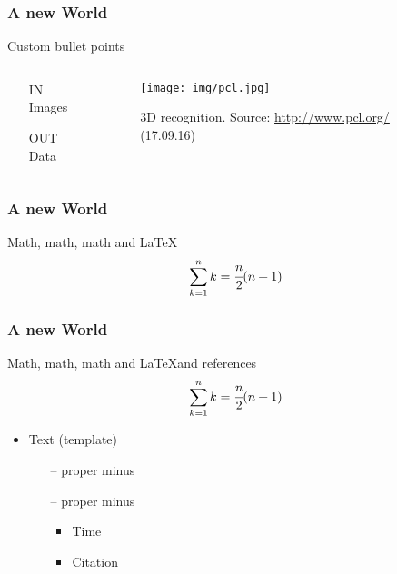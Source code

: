 \documentclass{beamer}
\begin{document}
\begin{frame}
\frametitle{A new World}
Custom bullet points
\begin{columns}
    \begin{column}{0.65\textwidth}
      \begin{itemize}
        \item [IN] Images
        \item [OUT] Data
      \end{itemize}
    \end{column}

    \begin{column}{0.35\textwidth}
      \begin{figure}[ht]
        \centering
        \texttt{[image: img/pcl.jpg]}
        \caption{3D recognition. \tiny{Source: \url{http://www.pcl.org/} (17.09.16)} }
      \end{figure}
    \end{column}
  \end{columns}
\end{frame}

\begin{frame}
    \frametitle{A new World}
    Math, math, math and \LaTeX
    \begin{equation}
      \sum_{k=1}^{n}{k} = \cfrac{n}{2}(n+1)
    \end{equation}
\end{frame}

\begin{frame}
    \frametitle{A new World}
    Math, math, math and \LaTeX and references
    \begin{equation}
      \sum_{k=1}^{n}{k} = \cfrac{n}{2}(n+1)
    \end{equation}

    \begin{itemize}
      \item Text (template)
      \begin{itemize}
        \item [\color{red}--] proper minus
        \item [\color{red}--] proper minus
        \begin{itemize}
          \item Time
          \item Citation \cite{martin1997island}
        \end{itemize}
      \end{itemize}
    \end{itemize}
\end{frame}
\end{document}
